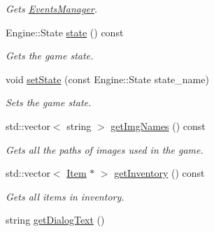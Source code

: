 \begin{DoxyCompactItemize}
\begin{DoxyCompactList}\small\item\em Gets \hyperlink{classEventsManager}{EventsManager}. \item\end{DoxyCompactList}\item 
\hypertarget{classEngine_ab024896c389c5433596082338eb70c72}{
Engine::State \hyperlink{classEngine_ab024896c389c5433596082338eb70c72}{state} () const }
\label{classEngine_ab024896c389c5433596082338eb70c72}

\begin{DoxyCompactList}\small\item\em Gets the game state. \item\end{DoxyCompactList}\item 
\hypertarget{classEngine_adc12afb2a30ebbe6bbf897f3a21fbb5e}{
void \hyperlink{classEngine_adc12afb2a30ebbe6bbf897f3a21fbb5e}{setState} (const Engine::State state\_\-name)}
\label{classEngine_adc12afb2a30ebbe6bbf897f3a21fbb5e}

\begin{DoxyCompactList}\small\item\em Sets the game state. \item\end{DoxyCompactList}\item 
\hypertarget{classEngine_a051a184de2e7651b841d3a0c19408552}{
std::vector$<$ string $>$ \hyperlink{classEngine_a051a184de2e7651b841d3a0c19408552}{getImgNames} () const }
\label{classEngine_a051a184de2e7651b841d3a0c19408552}

\begin{DoxyCompactList}\small\item\em Gets all the paths of images used in the game. \item\end{DoxyCompactList}\item 
\hypertarget{classEngine_a85f2f1ff9b032e6fe779cbc35068376b}{
std::vector$<$ \hyperlink{classItem}{Item} $\ast$ $>$ \hyperlink{classEngine_a85f2f1ff9b032e6fe779cbc35068376b}{getInventory} () const }
\label{classEngine_a85f2f1ff9b032e6fe779cbc35068376b}

\begin{DoxyCompactList}\small\item\em Gets all items in inventory. \item\end{DoxyCompactList}\item 
\hypertarget{classEngine_aef8bb330eaf4da38e0e2937e79b6e46f}{
string \hyperlink{classEngine_aef8bb330eaf4da38e0e2937e79b6e46f}{getDialogText} ()}
\label{classEngine_aef8bb330eaf4da38e0e2937e79b6e46f}


\end{DoxyCompactItemize}
